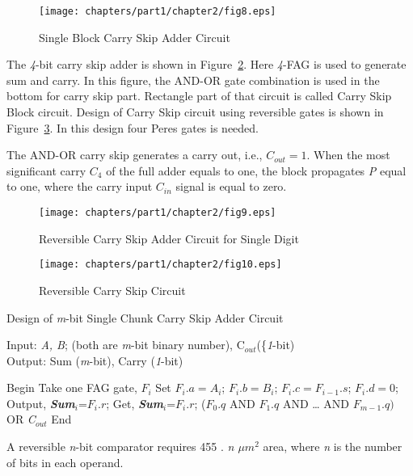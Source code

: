 \begin{figure}[!tbh]
	\centering
	\texttt{[image: chapters/part1/chapter2/fig8.eps]}
	\caption{Single Block Carry Skip Adder Circuit}
	\label{fig:p1_c2_fig8}
\end{figure}

The {\it 4}-bit carry skip adder is shown in Figure~\ref{fig:p1_c2_fig9}. Here {\it 4}-FAG is used to generate sum and carry. In this figure, the AND-OR gate combination is used in the bottom for carry skip part. Rectangle part of that circuit is called Carry Skip Block circuit. Design of Carry Skip circuit using reversible gates is shown in Figure~\ref{fig:p1_c2_fig10}. In this design four Peres gates is needed.

The AND-OR carry skip generates a carry out, i.e., $C_{out}=1$. When the most significant carry $C_4$
of the full adder equals to one, the block propagates \textit{P} equal to one, where the carry input
$C_{in}$ signal is equal to zero.

\begin{figure}[!tbh]
	\centering
	\texttt{[image: chapters/part1/chapter2/fig9.eps]}
	\caption{Reversible Carry Skip Adder Circuit for Single Digit}
	\label{fig:p1_c2_fig9}
\end{figure}


\begin{figure}[!tbh]
	\centering
	\texttt{[image: chapters/part1/chapter2/fig10.eps]}
	\caption{Reversible Carry Skip Circuit}
	\label{fig:p1_c2_fig10}
\end{figure}
 \begin{algorithm}[!h]
 	\caption{Design of {\it m}-bit Single Chunk Carry Skip Adder Circuit}
 	\label{alg:part1_c2_alg3}
 	Input: { {\it A, B}; (both are {\it m}-bit binary number), C${}_{out}$(\{\it1}-bit)\\
 	Output: { { Sum ({\it m}-bit), Carry ({\it 1}-bit)}}
 	\begin{algorithmic}[1]
 		
 		\STATE Begin
 		\STATE Take one FAG gate, $F{}_{i}$
 		\STATE Set $F{}_{i}.a=A{}_{i}$; $F{}_{i}.b=B{}_{i}$; $F{}_{i}.c=F{}_{i-1}.s$; $F{}_{i}.d=0$;
 		\STATE Output, {\bf {\it Sum${}_{i}$}}=$F{}_{i}.r$; 
 		\STATE Get, {\bf {\it Sum${}_{i}$}}=$F{}_{i}.r$;
 		\ENDFOR
 		($F{}_{0}.q$ {AND} $F{}_{1}.q$ {AND }{\dots} {AND} $F{}_{m-1}.q)${ OR {\it C${}_{out}$}}
 		\STATE End
 	\end{algorithmic}
 \end{algorithm}
\begin{property}\textnormal{
	A reversible {\it n}-bit comparator requires 455 ${.}$ {\it n $\mu m{}^{2}$} area, where {\it n} is the number of bits in each operand.}
\end{property}

